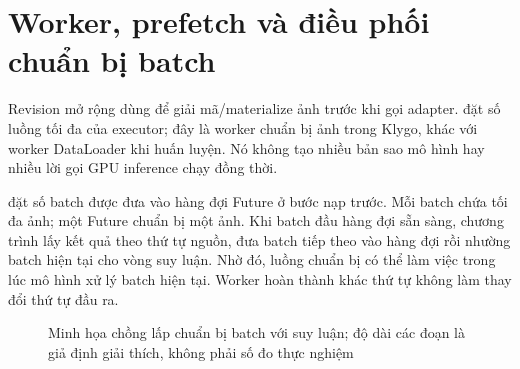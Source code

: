 \section{Worker, prefetch và điều phối chuẩn bị batch}
\label{sec:worker-prefetch}
Revision mở rộng dùng  để giải mã/materialize ảnh trước khi gọi adapter.  đặt số luồng tối đa của executor; đây là worker chuẩn bị ảnh trong Klygo, khác với worker DataLoader khi huấn luyện. Nó không tạo nhiều bản sao mô hình hay nhiều lời gọi GPU inference chạy đồng thời.

 đặt số batch được đưa vào hàng đợi Future ở bước nạp trước. Mỗi batch chứa tối đa  ảnh; một Future chuẩn bị một ảnh. Khi batch đầu hàng đợi sẵn sàng, chương trình lấy kết quả theo thứ tự nguồn, đưa batch tiếp theo vào hàng đợi rồi nhường batch hiện tại cho vòng suy luận. Nhờ đó, luồng chuẩn bị có thể làm việc trong lúc mô hình xử lý batch hiện tại. Worker hoàn thành khác thứ tự không làm thay đổi thứ tự đầu ra.

\begin{figure}[H]\centering
{}
\caption{Minh họa chồng lấp chuẩn bị batch với suy luận; độ dài các đoạn là giả định giải thích, không phải số đo thực nghiệm}
\label{fig:prefetch-timeline}
\end{figure}

